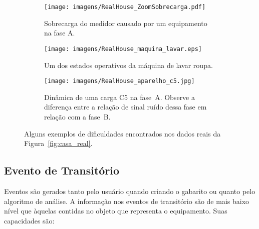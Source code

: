 \begin{figure*}[p!]
  \begin{center}
    \begin{subfigure}[c]{\textwidth}
      \texttt{[image: imagens/RealHouse\_ZoomSobrecarga.pdf]}
      \caption{Sobrecarga do medidor causado por um equipamento na
        fase A.}
      \label{fig:sobrecarga}
    \end{subfigure}
    \hfill
    \begin{subfigure}[c]{\textwidth}
      \texttt{[image: imagens/RealHouse\_maquina\_lavar.eps]}
      \caption{Um dos estados operativos da máquina de lavar
        roupa.}
      \label{fig:maquina_lavar}
    \end{subfigure}
    \hfill
    \begin{subfigure}[c]{\textwidth}
      \texttt{[image: imagens/RealHouse\_aparelho\_c5.jpg]}
      \caption{Dinâmica de uma carga C5 na fase~A. Observe a diferença
entre a relação de sinal ruído dessa fase em relação com a fase~B.}
      \label{fig:c5_ruido}
    \end{subfigure}
  \end{center}
\caption[Alguns exemplos de dificuldades encontrados nos dados reais]{
Alguns exemplos de dificuldades encontrados nos dados reais da
Figura~\ref{fig:casa_real}.}
\label{fig:dificuldades}
\end{figure*}

%


\subsection{Evento de Transitório}
\label{ssec:evento}

Eventos são gerados tanto pelo usuário quando criando o gabarito
ou quanto pelo algoritmo de análise. A informação nos eventos de
transitório são de mais baixo nível que àquelas contidas no objeto que
representa o equipamento. Suas capacidades são: 

